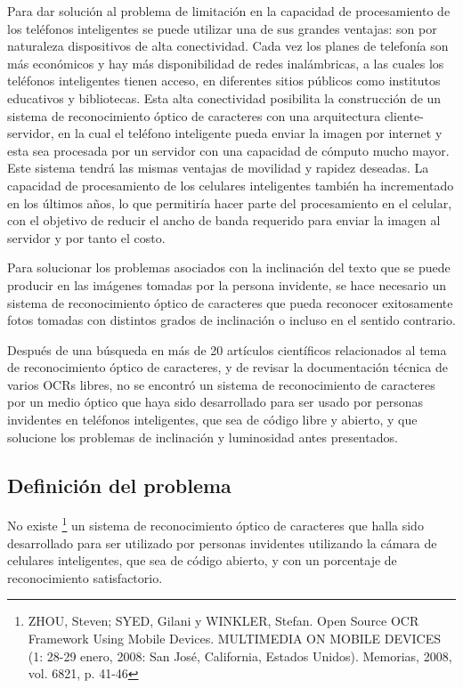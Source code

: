 \documentclass[a4paper, 11pt, oneside]{article}
\begin{document}
	Para dar solución al problema de limitación en la capacidad de procesamiento de los teléfonos inteligentes se puede utilizar una de sus grandes ventajas: son por naturaleza dispositivos de alta conectividad. Cada vez los planes de telefonía son más económicos y hay más disponibilidad de redes inalámbricas, a las cuales los teléfonos inteligentes tienen acceso, en diferentes sitios públicos como institutos educativos y bibliotecas. Esta alta conectividad posibilita la construcción de un sistema de reconocimiento óptico de caracteres con una arquitectura cliente-servidor, en la cual el teléfono inteligente pueda enviar la imagen por internet y esta sea procesada por un servidor con una capacidad de cómputo mucho mayor. Este sistema tendrá las mismas ventajas de movilidad y rapidez deseadas. La capacidad de procesamiento de los celulares inteligentes también ha incrementado en los últimos años, lo que permitiría hacer parte del procesamiento en el celular, con el objetivo de reducir el ancho de banda requerido para enviar la imagen al servidor y por tanto el costo.

	Para solucionar los problemas asociados con la inclinación del texto que se puede producir en las imágenes tomadas por la persona invidente, se hace necesario un sistema de reconocimiento óptico de caracteres que pueda reconocer exitosamente fotos tomadas con distintos grados de inclinación o incluso en el sentido contrario.

Después de una búsqueda en más de 20 artículos científicos relacionados al tema de reconocimiento óptico de caracteres, y de revisar la documentación técnica de varios OCRs libres, no se encontró un sistema de reconocimiento de caracteres por un medio óptico que haya sido desarrollado para ser usado por personas invidentes en teléfonos inteligentes, que sea de código libre y abierto, y que solucione los problemas de inclinación y luminosidad antes presentados. 	
	
	\subsection{Definición del problema}

	No existe \footnote{ZHOU, Steven; SYED, Gilani y WINKLER, Stefan. Open Source OCR Framework Using
    Mobile Devices. MULTIMEDIA ON MOBILE DEVICES (1: 28-29 enero, 2008: San José, California, Estados 
    Unidos). Memorias, 2008, vol. 6821, p. 41-46} un sistema de reconocimiento óptico de caracteres 
    que halla sido desarrollado para ser utilizado por personas invidentes utilizando la cámara de 
    celulares inteligentes, que sea de código abierto, y con un porcentaje de reconocimiento satisfactorio.
	
\end{document}
